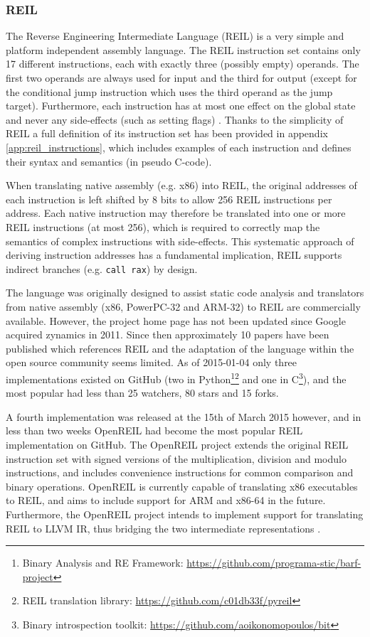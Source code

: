 
\subsubsection{REIL}

The Reverse Engineering Intermediate Language (REIL) is a very simple and platform independent assembly language. The REIL instruction set contains only 17 different instructions, each with exactly three (possibly empty) operands. The first two operands are always used for input and the third for output (except for the conditional jump instruction which uses the third operand as the jump target). Furthermore, each instruction has at most one effect on the global state and never any side-effects (such as setting flags) \cite{reil_paper,reil_spec}. Thanks to the simplicity of REIL a full definition of its instruction set has been provided in appendix \ref{app:reil_instructions}, which includes examples of each instruction and defines their syntax and semantics (in pseudo C-code).

When translating native assembly (e.g. x86) into REIL, the original addresses of each instruction is left shifted by 8 bits to allow 256 REIL instructions per address. Each native instruction may therefore be translated into one or more REIL instructions (at most 256), which is required to correctly map the semantics of complex instructions with side-effects. This systematic approach of deriving instruction addresses has a fundamental implication, REIL supports indirect branches (e.g. \texttt{call rax}) by design.

The language was originally designed to assist static code analysis and translators from native assembly (x86, PowerPC-32 and ARM-32) to REIL are commercially available. However, the project home page has not been updated since Google acquired zynamics in 2011. Since then approximately 10 papers have been published which references REIL and the adaptation of the language within the open source community seems limited. As of 2015-01-04 only three implementations existed on GitHub (two in Python\footnote{Binary Analysis and RE Framework: \url{https://github.com/programa-stic/barf-project}}\footnote{REIL translation library: \url{https://github.com/c01db33f/pyreil}} and one in C\footnote{Binary introspection toolkit: \url{https://github.com/aoikonomopoulos/bit}}), and the most popular had less than 25 watchers, 80 stars and 15 forks.

A fourth implementation was released at the 15th of March 2015 however, and in less than two weeks OpenREIL had become the most popular REIL implementation on GitHub. The OpenREIL project extends the original REIL instruction set with signed versions of the multiplication, division and modulo instructions, and includes convenience instructions for common comparison and binary operations. OpenREIL is currently capable of translating x86 executables to REIL, and aims to include support for ARM and x86-64 in the future. Furthermore, the OpenREIL project intends to implement support for translating REIL to LLVM IR, thus bridging the two intermediate representations \cite{openreil}.
